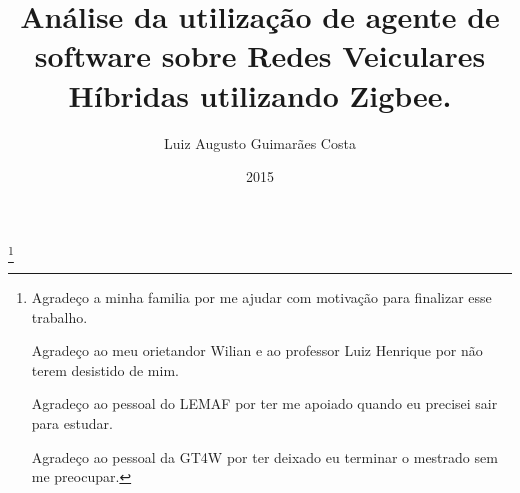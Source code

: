 \documentclass{uflamon-22}          %
\author{Luiz Augusto Guimarães Costa}
\title{Análise da utilização de agente de software sobre Redes Veiculares Híbridas utilizando Zigbee.}
\date{2015}
\begin{document}
\maketitle



\thanks{Agradeço a minha familia por me ajudar com motivação para finalizar esse trabalho. 

Agradeço ao meu orietandor Wilian e ao professor Luiz Henrique por não terem desistido de mim.

Agradeço ao pessoal do LEMAF por ter me apoiado quando eu precisei sair para estudar. 

Agradeço ao pessoal da GT4W por ter deixado eu terminar o mestrado sem me preocupar.}



\listoffigures
\listoftables
\tableofcontents

\pagestyle{ufla}





%



%
%

%

\end{document}
